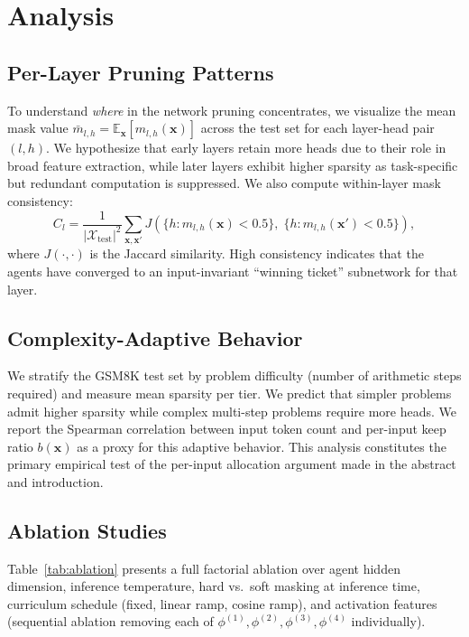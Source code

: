 \documentclass{article}
\begin{document}
\section{Analysis}
\label{sec:analysis}

\subsection{Per-Layer Pruning Patterns}
\label{sec:analysis_layer}

To understand \emph{where} in the network pruning concentrates, we visualize the mean mask
value $\bar{m}_{l,h} = \mathbb{E}_{\mathbf{x}}[m_{l,h}(\mathbf{x})]$ across the test set for
each layer-head pair $(l, h)$. We hypothesize that early layers retain more heads due to their
role in broad feature extraction, while later layers exhibit higher sparsity as task-specific
but redundant computation is suppressed. We also compute within-layer mask consistency:
\[
  C_l = \frac{1}{|\mathcal{X}_{\text{test}}|^2}
    \sum_{\mathbf{x}, \mathbf{x}'} J\!\left(
      \{h : m_{l,h}(\mathbf{x}) < 0.5\},\;
      \{h : m_{l,h}(\mathbf{x}') < 0.5\}
    \right),
\]
where $J(\cdot, \cdot)$ is the Jaccard similarity. High consistency indicates that the agents
have converged to an input-invariant ``winning ticket'' subnetwork for that layer.

\subsection{Complexity-Adaptive Behavior}
\label{sec:analysis_complexity}

We stratify the GSM8K test set by problem difficulty (number of arithmetic steps required)
and measure mean sparsity per tier. We predict that simpler problems admit higher sparsity
while complex multi-step problems require more heads. We report the Spearman correlation
between input token count and per-input keep ratio $b(\mathbf{x})$ as a proxy for this
adaptive behavior. This analysis constitutes the primary empirical test of the per-input
allocation argument made in the abstract and introduction.

\subsection{Ablation Studies}
\label{sec:analysis_ablation}

Table~\ref{tab:ablation} presents a full factorial ablation over agent hidden dimension,
inference temperature, hard vs.\ soft masking at inference time, curriculum schedule
(fixed, linear ramp, cosine ramp), and activation features (sequential ablation removing
each of $\phi^{(1)}, \phi^{(2)}, \phi^{(3)}, \phi^{(4)}$ individually).
\end{document}
